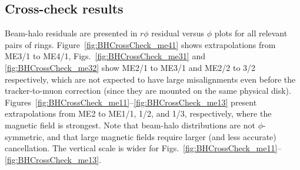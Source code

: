 \documentclass[12pt]{article}
\begin{document}
\subsection{Cross-check results}

Beam-halo residuals are presented in $r\phi$ residual versus $\phi$
plots for all relevant pairs of rings.
Figure~\ref{fig:BHCrossCheck_me41} shows extrapolations from ME3/1 to
ME4/1, Figs.~\ref{fig:BHCrossCheck_me31} and
\ref{fig:BHCrossCheck_me32} show ME2/1 to ME3/1 and ME2/2 to 3/2
respectively, which are not expected to have large misalignments even
before the tracker-to-muon correction (since they are mounted on the
same physical disk).
Figures~\ref{fig:BHCrossCheck_me11}--\ref{fig:BHCrossCheck_me13}
present extrapolations from ME2 to ME1/1, 1/2, and 1/3, respectively,
where the magnetic field is strongest.  Note that beam-halo
distributions are not $\phi$-symmetric, and that large magnetic fields
require larger (and less accurate) cancellation.  The vertical scale
is wider for
Figs.~\ref{fig:BHCrossCheck_me11}--\ref{fig:BHCrossCheck_me13}.
\end{document}
